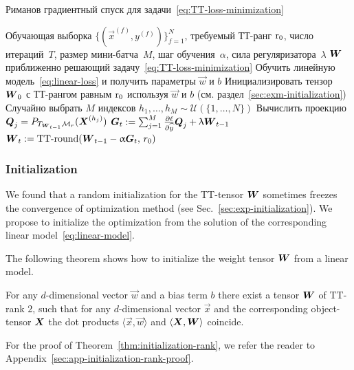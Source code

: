\begin{algorithm}[t]
   \caption{Риманов градиентный спуск для задачи~\eqref{eq:TT-loss-minimization}}
   \label{alg:rimeannian-optimization}
\begin{algorithmic}
   \REQUIRE Обучающая выборка $\{(\vec{x}^{(f)}, y^{(f)})\}_{f=1}^N$, требуемый ТТ-ранг $\operatorname{r}_0$, число итераций~$T$, размер мини-батча~$M$, шаг обучения~$\alpha$, сила регуляризатора~$\lambda$
   \ENSURE $\boldsymbol{W}$ приближенно решающий задачу~\eqref{eq:TT-loss-minimization}
   \STATE Обучить линейную модель~\eqref{eq:linear-loss} и получить параметры $\vec{w}$ и $b$
   \STATE Инициализировать тензор $\boldsymbol{W}_0$ с ТТ-рангом равным $\operatorname{r}_0$ используя $\vec{w}$ и $b$  (см. раздел~\ref{sec:exm-initialization})
        \STATE Случайно выбрать $M$ индексов $h_1, \ldots, h_M \sim \mathcal{U}(\{1, \ldots, N\})$
	        \STATE Вычислить проекцию $\boldsymbol{Q}_j = P_{T_{\boldsymbol{W}_{t-1}} \mathcal{M}_r} (\boldsymbol{X}^{(h_j)})$
        \ENDFOR
        \STATE $\boldsymbol{G}_t := \sum_{j=1}^M \frac{\partial \ell}{\partial \widehat{y}} \boldsymbol{Q}_j  + \uplambda \boldsymbol{W}_{t-1}$
        \STATE $\boldsymbol{W}_{t} := \operatorname{TT-round}(\boldsymbol{W}_{t-1} - \upalpha \boldsymbol{G}_t, \,r_0)$
   \ENDFOR
\end{algorithmic}
\end{algorithm}


\subsubsection{Initialization \label{sec:exm-initialization}}
We found that a random initialization for the TT-tensor $\boldsymbol{W}$ sometimes freezes the convergence of optimization method (see Sec.~\ref{sec:exp-initialization}).
We propose to initialize the optimization from the solution of the corresponding linear model~\eqref{eq:linear-model}.

The following theorem shows how to initialize the weight tensor $\boldsymbol{W}$ from a linear model.
\begin{theorem}
\label{thm:initialization-rank}
For any $d$-dimensional vector $\vec{w}$ and a bias term $b$ there exist a tensor $\boldsymbol{W}$ of TT-rank $2$, such that for any $d$-dimensional vector $\vec{x}$ and the corresponding object-tensor $\boldsymbol{X}$ the dot products $\langle \vec{x}, \vec{w} \rangle$ and $\langle \boldsymbol{X}, \boldsymbol{W} \rangle$ coincide.
\end{theorem}
For the proof of Theorem~\ref{thm:initialization-rank}, we refer the reader to Appendix~\ref{sec:app-initialization-rank-proof}.

